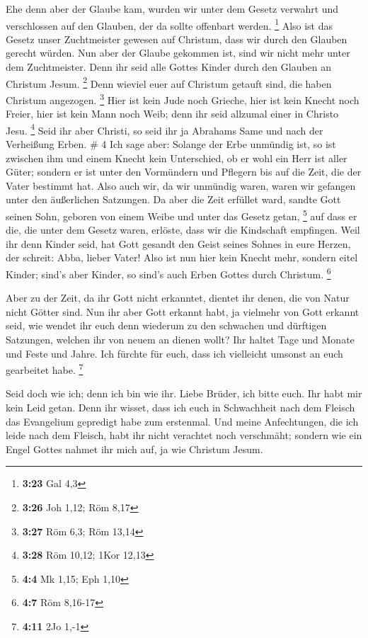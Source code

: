  Ehe denn aber der Glaube kam, wurden wir unter dem Gesetz
verwahrt und verschlossen auf den Glauben, der da sollte offenbart
werden. \footnote{\textbf{3:23} Gal 4,3}  Also ist das
Gesetz unser Zuchtmeister gewesen auf Christum, dass wir durch den
Glauben gerecht würden.  Nun aber der Glaube gekommen ist,
sind wir nicht mehr unter dem Zuchtmeister.  Denn ihr seid
alle Gottes Kinder durch den Glauben an Christum Jesum. \footnote{\textbf{3:26}
  Joh 1,12; Röm 8,17}  Denn wieviel euer auf Christum
getauft sind, die haben Christum angezogen. \footnote{\textbf{3:27} Röm
  6,3; Röm 13,14}  Hier ist kein Jude noch Grieche, hier
ist kein Knecht noch Freier, hier ist kein Mann noch Weib; denn ihr seid
allzumal einer in Christo Jesu. \footnote{\textbf{3:28} Röm 10,12; 1Kor
  12,13}  Seid ihr aber Christi, so seid ihr ja Abrahams
Same und nach der Verheißung Erben. \# 4  Ich sage aber:
Solange der Erbe unmündig ist, so ist zwischen ihm und einem Knecht kein
Unterschied, ob er wohl ein Herr ist aller Güter;  sondern
er ist unter den Vormündern und Pflegern bis auf die Zeit, die der Vater
bestimmt hat.  Also auch wir, da wir unmündig waren, waren
wir gefangen unter den äußerlichen Satzungen.  Da aber die
Zeit erfüllet ward, sandte Gott seinen Sohn, geboren von einem Weibe und
unter das Gesetz getan, \footnote{\textbf{4:4} Mk 1,15; Eph 1,10}
 auf dass er die, die unter dem Gesetz waren, erlöste, dass
wir die Kindschaft empfingen.  Weil ihr denn Kinder seid,
hat Gott gesandt den Geist seines Sohnes in eure Herzen, der schreit:
Abba, lieber Vater!  Also ist nun hier kein Knecht mehr,
sondern eitel Kinder; sind's aber Kinder, so sind's auch Erben Gottes
durch Christum. \footnote{\textbf{4:7} Röm 8,16-17}

 Aber zu der Zeit, da ihr Gott nicht erkanntet, dientet ihr
denen, die von Natur nicht Götter sind.  Nun ihr aber Gott
erkannt habt, ja vielmehr von Gott erkannt seid, wie wendet ihr euch
denn wiederum zu den schwachen und dürftigen Satzungen, welchen ihr von
neuem an dienen wollt?  Ihr haltet Tage und Monate und
Feste und Jahre.  Ich fürchte für euch, dass ich vielleicht
umsonst an euch gearbeitet habe. \footnote{\textbf{4:11} 2Jo 1,-1}

 Seid doch wie ich; denn ich bin wie ihr. Liebe Brüder, ich
bitte euch. Ihr habt mir kein Leid getan.  Denn ihr wisset,
dass ich euch in Schwachheit nach dem Fleisch das Evangelium gepredigt
habe zum erstenmal.  Und meine Anfechtungen, die ich leide
nach dem Fleisch, habt ihr nicht verachtet noch verschmäht; sondern wie
ein Engel Gottes nahmet ihr mich auf, ja wie Christum Jesum.

